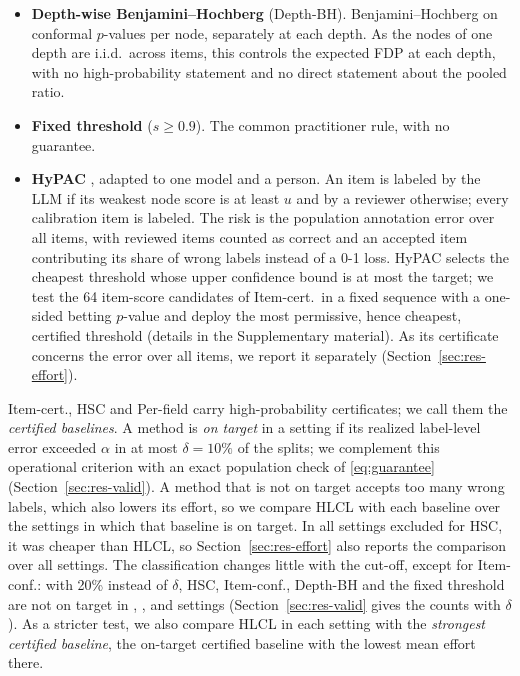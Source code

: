 \documentclass[preprint,12pt]{elsarticle}
\theoremstyle{definition}
\newcommand{\hlcl}{\textup{\textsc{HLCL}}}
\begin{document}
\begin{itemize}
  a full predicted path are selected, so the item-level FDP bounds the
  label-level FDP pointwise, but \eqref{eq:guarantee} does not follow. The fit
  split is not used for ordering or test selection.
  \item \textbf{Depth-wise Benjamini--Hochberg} (Depth-BH). Benjamini--Hochberg
  on conformal $p$-values per node, separately at each depth. As the nodes of
  one depth are i.i.d.\ across items, this controls the expected FDP at each
  depth, with no high-probability statement and no direct statement about the
  pooled ratio.
  \item \textbf{Fixed threshold} ($s\ge0.9$). The common practitioner rule,
  with no guarantee.
  \item \textbf{HyPAC} \citep{zeng2026hypac}, adapted to one model and a person.
  An item is labeled by the LLM if its weakest node score is at least $u$ and by
  a reviewer otherwise; every calibration item is labeled. The risk is the
  population annotation error over all items, with reviewed items counted as
  correct and an accepted item contributing its share of wrong labels instead of
  a 0-1 loss. HyPAC selects the cheapest threshold whose upper confidence bound
  is at most the target; we test the 64 item-score candidates of Item-cert.\ in
  a fixed sequence with a one-sided betting $p$-value and deploy the most
  permissive, hence cheapest, certified threshold (details in the
  Supplementary material). As its certificate concerns the error over all
  items, we report it separately (Section~\ref{sec:res-effort}).
\end{itemize}
Item-cert., HSC and Per-field carry high-probability certificates; we call them
the \emph{certified baselines}. A method is \emph{on target} in a setting if its
realized label-level error exceeded $\alpha$ in at most $\delta=10\%$ of the
splits; we complement this operational criterion with an exact population
check of \eqref{eq:guarantee} (Section~\ref{sec:res-valid}).
A method that is not on target accepts too many wrong labels, which also lowers
its effort, so we compare \hlcl{} with each baseline over the settings in which
that baseline is on target. In all  settings excluded for HSC,
it was cheaper than \hlcl{}, so Section~\ref{sec:res-effort} also reports the
comparison over all settings. The classification changes little with the
cut-off, except for Item-conf.: with 20\% instead of $\delta$, HSC, Item-conf.,
Depth-BH and the fixed threshold are not on target in ,
,  and
 settings (Section~\ref{sec:res-valid} gives the
counts with $\delta$). As a stricter test, we also compare \hlcl{} in each setting with
the \emph{strongest certified baseline}, the on-target certified baseline with
the lowest mean effort there.
\end{document}
